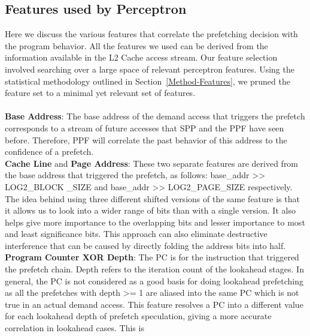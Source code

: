 \subsection{Features used by Perceptron}
\label{Impl-Features}
Here we discuss the various features that correlate the prefetching
decision with the program behavior. All the features we used can be 
derived from the information available in the L2 Cache access stream.
Our feature selection involved searching over a large space of 
relevant perceptron features. Using the statistical methodology 
outlined in Section~\ref{Method-Features}, we pruned the feature 
set to a minimal yet relevant set of features. \\ \\
%
%
\textbf{Base Address}: The base address of the demand access that triggers the
prefetch corresponds to a stream of future accesses that SPP and the PPF have
seen before.  Therefore, PPF will correlate the past behavior of this address
to the confidence of a prefetch. \\
%
\textbf{Cache Line} and \textbf{Page Address}: These two separate features are
derived from the base address that triggered the prefetch, as follows:
base\_addr >> LOG2\_BLOCK \_SIZE and base\_addr >> LOG2\_PAGE\_SIZE
respectively. The idea behind using three different shifted versions of the
same feature is that it allows us to look into a wider range of bits than with
a single version.  It also helps give more importance to the overlapping bits
and lesser importance to most and least significance bits. This approach can
also eliminate destructive interference that can be caused by directly folding
the address bits into half. \\
%
\textbf{Program Counter XOR Depth}: The PC is for the instruction that
triggered the prefetch chain.  Depth refers to the iteration count of the
lookahead stages.  In general, the PC is not considered as a good basis for
doing lookahead prefetching as all the prefetches with depth >= 1 are aliased
into the same PC which is not true in an actual demand access.  This feature
resolves a PC into a different value for each lookahead depth of prefetch
speculation, giving a more accurate correlation in lookahead cases.  This is
